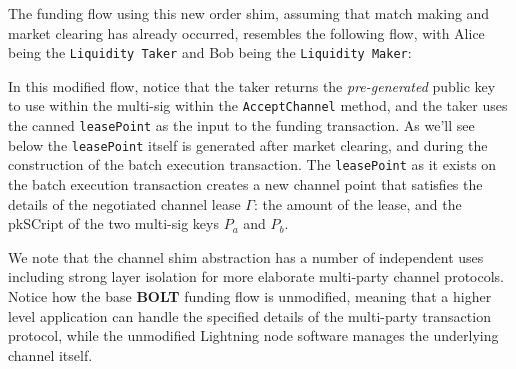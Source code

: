 \documentclass[10pt,a4paper]{article}
\theoremstyle{definition}
\begin{document}
The funding flow using this new order shim, assuming that match making and
market clearing has already occurred, resembles the following flow, with Alice
being the \texttt{Liquidity Taker} and Bob being the \texttt{Liquidity Maker}:
\begin{pcvstack}[boxed,center,space=1em]

\end{pcvstack} 

In this modified flow, notice that the taker returns the \emph{pre-generated}
public key to use within the multi-sig within the \texttt{AcceptChannel}
method, and the taker uses the canned \texttt{leasePoint} as the input to the
funding transaction. As we'll see below the \texttt{leasePoint} itself is
generated after market clearing, and during the construction of the batch
execution transaction. The \texttt{leasePoint} as it exists on the batch
execution transaction creates a new channel point that satisfies the details of
the negotiated channel lease $\Gamma$: the amount of the lease, and the
pkSCript of the two multi-sig keys $P_a$ and $P_b$.

We note that the channel shim abstraction has a number of independent uses
including strong layer isolation for more elaborate multi-party channel
protocols. Notice how the base \textbf{BOLT} funding flow is unmodified,
meaning that a higher level application can handle the specified details of the
multi-party transaction protocol, while the unmodified Lightning node software
manages the underlying channel itself.
\end{document}
